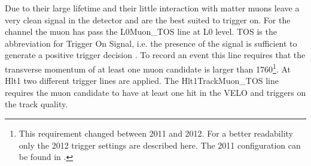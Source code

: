 Due to their large lifetime and their little interaction with matter muons leave a very clean signal in the detector and are the best suited to trigger on. For the \LbToDpmunuX channel the muon has pass the L0Muon\_TOS line at L0 level. TOS is the abbreviation for Trigger On Signal, i.e. the presence of the signal is sufficient to generate a positive trigger decision \cite{Tolk:1701134}. 
To record an event this line requires that the transverse momentum of at least one muon candidate is larger than 1760\mev\footnote{This requirement changed between 2011 and 2012. For a better readability only the 2012 trigger settings are described here. The 2011 configuration can be found in \cite{Trigger_2011_2012}.}.
At Hlt1 two different trigger lines are applied. The Hlt1TrackMuon\_TOS line requires the muon candidate to have at least one hit in the VELO and triggers on the track quality.
